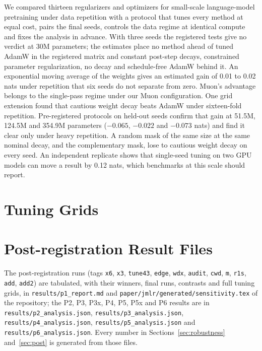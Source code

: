 \documentclass[twoside,11pt]{article}
\begin{document}
We compared thirteen regularizers and optimizers for small-scale language-model pretraining under data repetition with a protocol that tunes every method at equal cost, pairs the final seeds, controls the data regime at identical compute and fixes the analysis in advance. With three seeds the registered tests give no verdict at 30M parameters; the estimates place no method ahead of tuned AdamW in the registered matrix and constant post-step decays, constrained parameter regularization, no decay and schedule-free AdamW behind it. An exponential moving average of the weights gives an estimated gain of 0.01 to 0.02 nats under repetition that six seeds do not separate from zero. Muon's advantage belongs to the single-pass regime under our Muon configuration. One grid extension found that cautious weight decay beats AdamW under sixteen-fold repetition. Pre-registered protocols on held-out seeds confirm that gain at 51.5M, 124.5M and 354.9M parameters ($-0.065$, $-0.022$ and $-0.073$ nats) and find it clear only under heavy repetition. A random mask of the same size at the same nominal decay, and the complementary mask, lose to cautious weight decay on every seed. An independent replicate shows that single-seed tuning on two GPU models can move a result by 0.12 nats, which benchmarks at this scale should report.


\appendix

\section{Tuning Grids}
\label{app:grids}



\section{Post-registration Result Files}
\label{app:sensitivity}

{\sloppy The post-registration runs (tags \texttt{x6}, \texttt{x3}, \texttt{tune43}, \texttt{edge}, \texttt{wdx}, \texttt{audit}, \texttt{cwd}, \texttt{m}, \texttt{r1s}, \texttt{add}, \texttt{add2}) are tabulated, with their winners, final runs, contrasts and full tuning grids, in \texttt{results/p1\_report.md} and \texttt{paper/jmlr/generated/sensitivity.tex} of the repository; the P2, P3, P3x, P4, P5, P5x and P6 results are in \texttt{results/p2\_analysis.json}, \texttt{results/p3\_analysis.json}, \texttt{results/p4\_analysis.json}, \texttt{results/p5\_analysis.json} and \texttt{results/p6\_analysis.json}. Every number in Sections~\ref{sec:robustness} and~\ref{sec:post} is generated from those files.\par}

\vskip 0.2in

\end{document}
